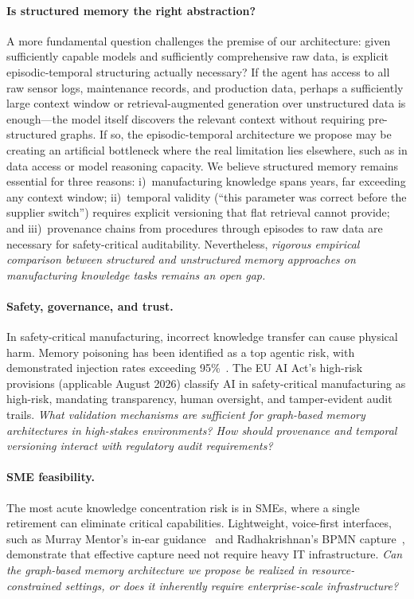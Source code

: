 \documentclass[]{ceurart}
\begin{document}
\paragraph{Is structured memory the right abstraction?}
A more fundamental question challenges the premise of our
architecture: given sufficiently capable models and sufficiently
comprehensive raw data, is explicit episodic-temporal structuring
actually necessary? If the agent has access to all raw sensor logs,
maintenance records, and production data, perhaps a sufficiently
large context window or retrieval-augmented generation over
unstructured data is enough---the model itself discovers the relevant
context without requiring pre-structured graphs. If so, the
episodic-temporal architecture we propose may be creating an
artificial bottleneck where the real limitation lies elsewhere, such
as in data access or model reasoning capacity. We believe structured
memory remains essential for three reasons: i)~manufacturing
knowledge spans years, far exceeding any context window;
ii)~temporal validity (``this parameter was correct before
the supplier switch'') requires explicit versioning that flat
retrieval cannot provide; and iii)~provenance chains from
procedures through episodes to raw data are necessary for
safety-critical auditability. Nevertheless, \emph{rigorous empirical
comparison between structured and unstructured memory approaches on
manufacturing knowledge tasks remains an open gap.}

\paragraph{Safety, governance, and trust.}
In safety-critical manufacturing, incorrect knowledge transfer can cause
physical harm. Memory poisoning has been identified as a top agentic
risk, with demonstrated injection rates exceeding
95\%~\cite{owasp2026}. The EU AI Act's high-risk provisions (applicable August 2026)
classify AI in safety-critical manufacturing as high-risk, mandating
transparency, human oversight, and tamper-evident audit trails.
\emph{What validation mechanisms are sufficient for graph-based memory
architectures in high-stakes environments? How should provenance and
temporal versioning interact with regulatory audit requirements?}

\paragraph{SME feasibility.}
The most acute knowledge concentration risk is in SMEs, where a single
retirement can eliminate critical capabilities. Lightweight, voice-first
interfaces, such as Murray Mentor's in-ear guidance~\cite{murraymentor2025} and Radhakrishnan's
BPMN capture~\cite{radhakrishnan2025}, demonstrate that
effective capture need not require heavy IT infrastructure. \emph{Can the
graph-based memory architecture we propose be realized in
resource-constrained settings, or does it inherently require
enterprise-scale infrastructure?}
\end{document}
